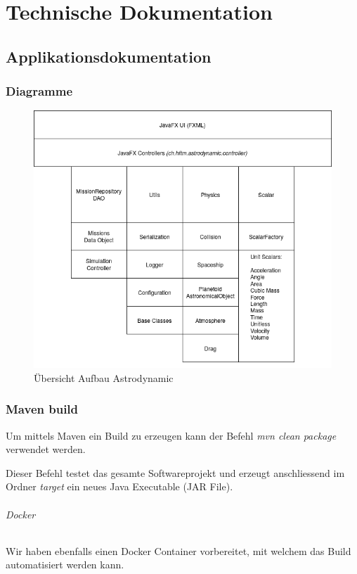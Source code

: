 \chapter{Technische Dokumentation}

\section{Applikationsdokumentation}

\subsection{Diagramme}

\begin{figure}[H]
	\centering
	\includegraphics[width=12cm]{res/overview.png}
	\caption{Übersicht Aufbau Astrodynamic}
\end{figure}

\subsection{Maven build}

Um mittels Maven ein Build zu erzeugen kann der Befehl \textit{mvn clean package} verwendet werden.

Dieser Befehl testet das gesamte Softwareprojekt und erzeugt anschliessend im Ordner \textit{target} ein neues Java Executable (JAR File).

\subparagraph{Docker}

Wir haben ebenfalls einen Docker Container vorbereitet, mit welchem das Build automatisiert werden kann.

